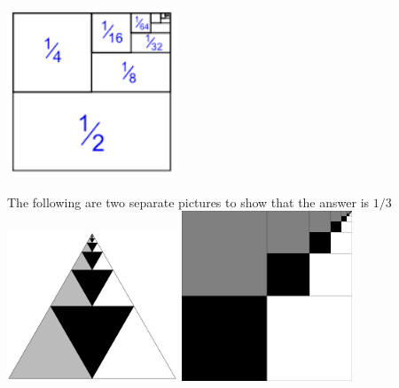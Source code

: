 


\includegraphics[width=2in]{assets/andy/series2n}






The following are two separate pictures to show that the answer is $1/3$
\includegraphics[width=2in]{assets/andy/series4n-1}
\includegraphics[width=2in]{assets/andy/series4n-2}

